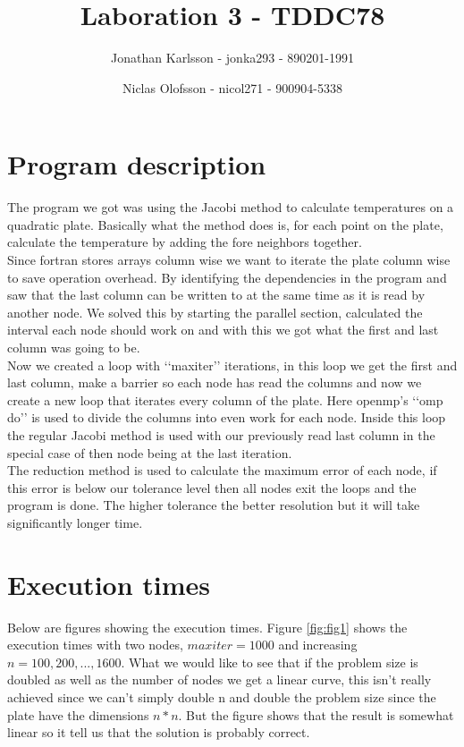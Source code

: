\documentclass[a4paper]{article}
\author{Jonathan Karlsson - jonka293 - 890201-1991 \and Niclas Olofsson - nicol271 - 900904-5338}
\title{Laboration 3 - TDDC78}
\begin{document}
\maketitle

\section{Program description}

The program we got was using the Jacobi method to calculate temperatures
on a quadratic plate. Basically what the method does is, for each point
on the plate, calculate the temperature by adding the fore neighbors
together.\\

Since fortran stores arrays column wise we want to iterate the plate
column wise to save operation overhead. By identifying the dependencies
in the program and saw that the last column can be written to at the
same time as it is read by another node. We solved this by starting the
parallel section, calculated  the interval each node should work on and
with this we got what the first and last column was going to be.\\

Now we created a loop with \lq\lq{}maxiter\rq\rq{} iterations, in this
loop we get the first and last column, make a barrier so each node has
read the columns and now we create a new loop that iterates every column
of the plate. Here openmp\rq{}s \lq\lq{}omp do\rq\rq{} is used to divide
the columns into even work for each node. Inside this loop the regular
Jacobi method is used with our previously read last column in the
special case of then node being at the last iteration.\\

The reduction method is used to calculate the maximum error of each
node, if this error is below our tolerance level then all nodes exit the
loops and the program is done. The higher tolerance the better
resolution but it will take significantly longer time.

\section{Execution times}

Below are figures showing the execution times. Figure \ref{fig:fig1}
shows the execution times with two nodes, $maxiter = 1000$ and
increasing $n = 100, 200, ..., 1600$. What we would like to see that if
the problem size is doubled as well as the number of nodes we get a
linear curve, this isn\rq{}t really achieved since we can\rq{}t simply
double n and double the problem size since the plate have the dimensions
$n * n$. But the figure shows that the result is somewhat linear so it
tell us that the solution is probably correct.\\
\end{document}
